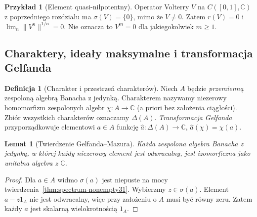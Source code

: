 \documentclass[11pt,a4paper]{article}
\numberwithin{equation}{section}
\theoremstyle{plain}
\newtheorem{lemat}[twierdzenie]{Lemat}
\theoremstyle{definition}
\newtheorem{definicja}[twierdzenie]{Definicja}
\newtheorem{przyklad}[twierdzenie]{Przykład}
\theoremstyle{remark}
\newcommand{\C}{\mathbb C}
\begin{document}
\begin{przyklad}[Element quasi-nilpotentny]
Operator Volterry $V$ na $C([0,1],\C)$ z
poprzedniego rozdziału ma $\sigma(V)=\{0\}$,
mimo że $V\ne0$. Zatem $r(V)=0$ i
$\lim_n\|V^n\|^{1/n}=0$. Nie oznacza to $V^m=0$
dla jakiegokolwiek $m\ge1$.
\end{przyklad}

\subsection{Charaktery, ideały maksymalne i transformacja Gelfanda}

\begin{definicja}[Charakter i przestrzeń charakterów]
\label{def:character31}
Niech $A$ będzie \emph{przemienną} zespoloną algebrą Banacha
z jedynką. Charakterem nazywamy niezerowy homomorfizm
zespolonych algebr $\chi:A\to\C$ (a priori bez założenia ciągłości).
Zbiór wszystkich charakterów oznaczamy $\Delta(A)$.
\emph{Transformacja Gelfanda} przyporządkowuje elementowi $a\in A$
funkcję $\widehat a:\Delta(A)\to\C$, $\widehat a(\chi)=\chi(a)$.
\end{definicja}

\begin{lemat}[Twierdzenie Gelfanda--Mazura]
\label{lem:gelfand-mazur31}
Każda zespolona algebra Banacha z jedynką, w której każdy niezerowy
element jest odwracalny, jest izomorficzna jako unitalna algebra z $\C$.
\end{lemat}
\begin{proof}
Dla $a\in A$ widmo $\sigma(a)$ jest niepuste na mocy
twierdzenia~\ref{thm:spectrum-nonempty31}. Wybierzmy
$z\in\sigma(a)$. Element $a-z1_A$ nie jest odwracalny,
więc przy założeniu o $A$ musi być równy zeru.
Zatem każdy $a$ jest skalarną wielokrotnością $1_A$.
\end{proof}
\end{document}
